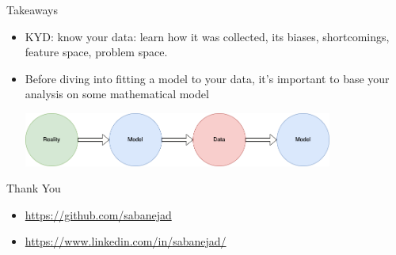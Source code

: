 \documentclass{beamer}
\begin{document}
\begin{frame}{Takeaways}
  \begin{itemize}
    \item<+-> KYD: know your data: learn how it was collected, its biases, shortcomings, feature space, problem space.
    \item<+-> Before diving into fitting a model to your data, it's important to base your analysis on some mathematical model
    \vspace{1cm}
    \begin{center}
    \includegraphics[width=0.8\textwidth]{images/reality-model-data.png}
    \end{center}
  \end{itemize}
\end{frame}

\begin{frame}{Thank You}
  \begin{itemize}
  \item \url{https://github.com/sabanejad}
  \item \url{https://www.linkedin.com/in/sabanejad/}
  \end{itemize}
\end{frame}


\end{document}
